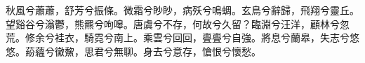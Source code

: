 
\begin{pinyinscope}
秋風兮蕭蕭，舒芳兮振條。微霜兮眇眇，病殀兮鳴蜩。玄鳥兮辭歸，飛翔兮靈丘。望谿谷兮滃鬱，熊羆兮呴嗥。唐虞兮不存，何故兮久留？臨淵兮汪洋，顧林兮忽荒。修余兮袿衣，騎霓兮南上。乘雲兮回回，亹亹兮自強。將息兮蘭皋，失志兮悠悠。蒶蘊兮黴鯬，思君兮無聊。身去兮意存，愴恨兮懷愁。


\end{pinyinscope}